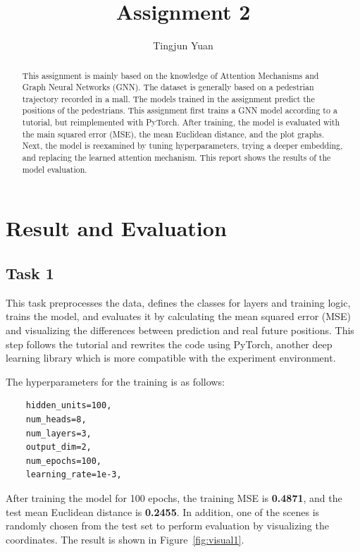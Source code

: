\documentclass[conference]{IEEEtran}
\begin{document}
\title{Assignment 2}

\author{Tingjun Yuan}

\maketitle

\begin{abstract}
This assignment is mainly based on the knowledge of Attention Mechanisms and
Graph Neural Networks (GNN). The dataset is generally based on a pedestrian
trajectory recorded in a mall. The models trained in the assignment predict
the positions of the pedestrians. This assignment first trains a GNN model
according to a tutorial, but reimplemented with PyTorch. After training, the
model is evaluated with the main squared error (MSE), the mean Euclidean
distance, and the plot graphs. Next, the model is reexamined by tuning
hyperparameters, trying a deeper embedding, and replacing the learned attention
mechanism. This report shows the results of the model evaluation.
\end{abstract}

\section{Result and Evaluation}

\subsection*{Task 1}

This task preprocesses the data, defines the classes for layers and training
logic, trains the model, and evaluates it by calculating the mean squared error
(MSE) and visualizing the differences between prediction and real future
positions. This step follows the tutorial \cite{cite:tut} and rewrites the code
using PyTorch, another deep learning library which is more compatible with the
experiment environment.

The hyperparameters for the training is as follows:

\begin{verbatim}
    hidden_units=100,
    num_heads=8,
    num_layers=3,
    output_dim=2,
    num_epochs=100,
    learning_rate=1e-3,
\end{verbatim}

After training the model for 100 epochs, the training MSE is \textbf{0.4871},
and the test mean Euclidean distance is \textbf{0.2455}. In addition, one of
the scenes is randomly chosen from the test set to perform evaluation by
visualizing the coordinates. The result is shown in Figure~\ref{fig:visual1}.
\end{document}
